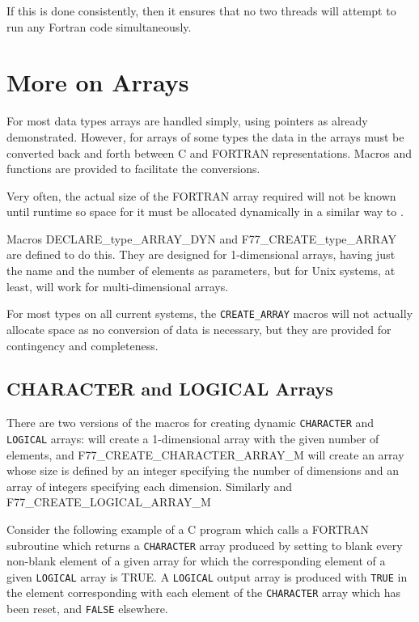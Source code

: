 \documentclass[twoside,11pt,nolof]{starlink}
\begin{document}
If this is done consistently, then it ensures that no two threads will
attempt to run any Fortran code simultaneously.

\section{More on Arrays}
For most data types arrays are handled simply, using pointers as already
demonstrated. However, for arrays of some types the data in the arrays
must be converted back and forth between C and FORTRAN representations.
Macros and functions are provided to facilitate the conversions.

Very often, the actual size of the FORTRAN array required will not be known
until runtime so space for it must be allocated dynamically in a similar way
to
.

Macros
        {DECLARE_type_ARRAY_DYN}
and
        {F77_CREATE_type_ARRAY}
are defined to do this.
They are designed for 1-dimensional arrays, having just the name and the number
of elements as parameters, but for Unix systems, at least, will work for
multi-dimensional arrays.

For most types on all current systems, the \texttt{CREATE\_ARRAY} macros
will not actually allocate space as no conversion of data is necessary, but
they are provided for contingency and completeness.

\subsection{\label{char_arrays}CHARACTER and LOGICAL Arrays}
There are two versions of the macros for creating dynamic \texttt{CHARACTER}
and \texttt{LOGICAL} arrays:
will create a 1-dimensional array with the given number of elements, and
        {F77_CREATE_CHARACTER_ARRAY\_M}
will create an array whose size is defined by an integer specifying the number
of dimensions and an array of integers specifying each dimension.
Similarly
and
        {F77_CREATE_LOGICAL_ARRAY\_M}

Consider the following example of a C program which calls a FORTRAN subroutine
which returns a \texttt{CHARACTER} array produced by setting to blank every
non-blank element of a given array for which the corresponding element of a
given \texttt{LOGICAL} array is TRUE. A \texttt{LOGICAL} output array is
produced with \texttt{TRUE} in the element corresponding with each element of
the \texttt{CHARACTER} array which has been reset, and \texttt{FALSE} elsewhere.
\end{document}
